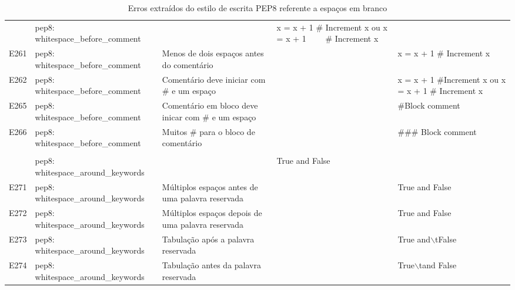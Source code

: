 \begin{landscape}
\begin{table}
\begin{tabularx}{\linewidth}{ |p{0.5cm}|p{6cm}|p{5.5cm}|X|X|}
				&   
				&   
				&   
				&  \\ 
				\hline
				
				& pep8: whitespace\_before\_comment 
				&   
				& x = x + 1  \# Increment x ou x = x + 1 \ \ \ \ \# Increment x  
				&  \\ 
				\hline
				E261 
				& pep8: whitespace\_before\_comment 
				& Menos de dois espaços antes do comentário 
				&   
				& x = x + 1 \# Increment x \\ 
				\hline
				E262 
				& pep8: whitespace\_before\_comment 
				& Comentário deve iniciar com \# e um espaço 
				&   
				& x = x + 1  \#Increment x ou x = x + 1  \#  Increment x \\ 
				\hline
				E265 
				& pep8: whitespace\_before\_comment 
				& Comentário em bloco deve inicar com \# e um espaço 
				&   
				& \#Block comment \\ 
				\hline
				E266 
				& pep8: whitespace\_before\_comment 
				& Muitos \# para o bloco de comentário 
				&   
				& \#\#\# Block comment \\ 
				\hline
				
				&   
				&   
				&   
				&  \\ 
				\hline
				
				& pep8: whitespace\_around\_keywords 
				&   
				& True and False  
				&  \\ 
				\hline
				E271 
				& pep8: whitespace\_around\_keywords 
				& Múltiplos espaços antes de uma palavra reservada 
				&   
				& True and  False \\ 
				\hline
				E272 
				& pep8: whitespace\_around\_keywords 
				& Múltiplos espaços depois de uma palavra reservada 
				&   
				& True  and False \\ 
				\hline
				E273 
				& pep8: whitespace\_around\_keywords 
				& Tabulação após a palavra reservada 
				&   
				& True and$\backslash$tFalse \\ 
				\hline
				E274 
				& pep8: whitespace\_around\_keywords 
				& Tabulação antes da palavra reservada 
				&   
				& True$\backslash$tand False \\ 
				\hline
			\end{tabularx}
			\captionsetup{justification=centering}
			\caption{Erros extraídos do estilo de escrita PEP8 referente a espaços em branco}
			\label{tab:pep8E200}
		\end{table}
	\end{landscape}
	
